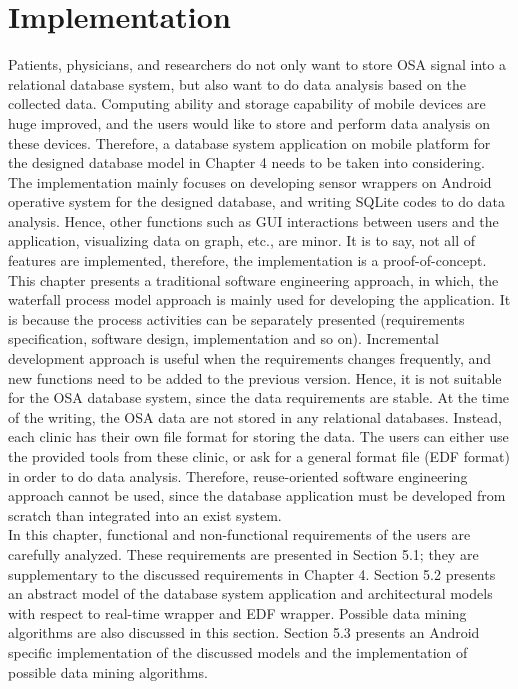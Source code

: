\chapter{Implementation}
Patients, physicians, and researchers do not only want to store OSA signal into a relational database system, but also want to do data analysis based on the collected data. Computing ability and storage capability of mobile devices are huge improved, and the users would like to store and perform data analysis on these devices. Therefore, a database system application on mobile platform for the designed database model in Chapter 4 needs to be taken into considering. The implementation mainly focuses on developing sensor wrappers on Android operative system for the designed database, and writing SQLite codes to do data analysis. Hence, other functions such as GUI interactions between users and the application, visualizing data on graph, etc., are minor. It is to say, not all of features are implemented, therefore, the implementation is a proof-of-concept. This chapter presents a traditional software engineering approach, in which, the waterfall process model approach is mainly used for developing the application. It is because the process activities can be separately presented (requirements specification, software design, implementation and so on). Incremental development approach is useful when the requirements changes frequently, and new functions need to be added to the previous version. Hence, it is not suitable for the OSA database system, since the data requirements are stable. At the time of the writing, the OSA data are not stored in any relational databases. Instead, each clinic has their own file format for storing the data. The users can either use the provided tools from these clinic, or ask for a general format file (EDF format) in order to do data analysis. Therefore, reuse-oriented software engineering approach cannot be used, since the database application must be developed from scratch than integrated into an exist system.\\
In this chapter, functional and non-functional requirements of the users are carefully analyzed. These requirements are presented in Section 5.1; they are supplementary to the discussed requirements in Chapter 4. Section 5.2 presents an abstract model of the database system application and architectural models with respect to real-time wrapper and EDF wrapper. Possible data mining algorithms are also discussed in this section. Section 5.3 presents an Android specific implementation of the discussed models and the implementation of possible data mining algorithms.
